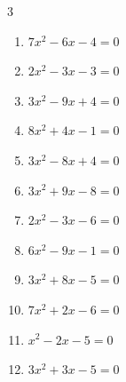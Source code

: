 \begin{multicols}{3}
\begin{enumerate}

  \item $7x^{2}-6x-4=0$


  \item $2x^{2}-3x-3=0$


  \item $3x^{2}-9x+4=0$


\columnbreak %

  \item $8x^{2}+4x-1=0$


  \item $3x^{2}-8x+4=0$


  \item $3x^{2}+9x-8=0$


  \item $2x^{2}-3x-6=0$


  \item $6x^{2}-9x-1=0$


  \item $3x^{2}+8x-5=0$


  \item $7x^{2}+2x-6=0$


\columnbreak %

\resetques

  \item $x^{2}-2x-5=0$


  \item $3x^{2}+3x-5=0$


\end{enumerate}
\end{multicols}
